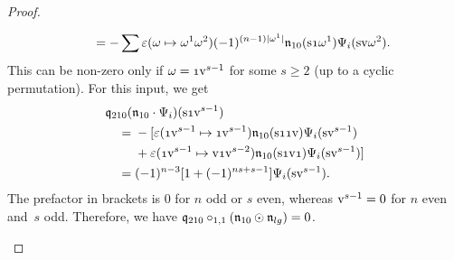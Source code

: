\documentclass[\MainFolder/Text.tex]{subfiles}
\begin{document}
\begin{proof}
\begin{description}[font=\normalfont\itshape]
\begin{align*}
 & \qquad = - \sum \varepsilon(\omega\mapsto \omega^1 \omega^2)(-1)^{(n-1)\Abs{\omega^1}} \PMC_{10}(\Susp \NOne \omega^1) \Psi_i(\Susp \NVol \omega^2).
\end{align*}
This can be non-zero only if $\omega = \NOne \NVol^{s-1}$ for some $s\ge 2$ (up to a cyclic permutation). For this input, we get
\begin{align*} &\OPQ_{210}(\PMC_{10}\cdot \Psi_i)(\Susp \NOne \NVol^{s-1}) \\ &\quad = \begin{aligned}[t]
&-[\varepsilon(\NOne \NVol^{s-1} \mapsto \NOne\NVol^{s-1})\PMC_{10}(\Susp \NOne\NOne\NVol)\Psi_i(\Susp\NVol^{s-1}) \\
&{}+ \varepsilon(\NOne \NVol^{s-1} \mapsto \NVol\NOne\NVol^{s-2})\PMC_{10}(\Susp \NOne\NVol\NOne)  \Psi_i(\Susp\NVol^{s-1})] \end{aligned} \\
 &\quad= (-1)^{n-3}[1+(-1)^{ns+s-1}] \Psi_i(\Susp\NVol^{s-1}).
\end{align*}
The prefactor in brackets is $0$ for $n$ odd or $s$ even, whereas $\mathrm{v}^{s-1} = 0$ for $n$ even and~$s$ odd. Therefore,  we have $\mathfrak{q}_{210}\circ_{1,1} (\mathfrak{n}_{10}\odot \mathfrak{n}_{lg}) = 0$. \qedhere
\end{description}
\end{proof}

\end{document}
